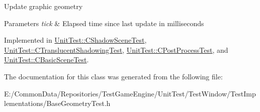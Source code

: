 Update graphic geometry 
\begin{DoxyParams}{Parameters}
{\em tick} & Elapsed time since last update in milliseconds \\
\hline
\end{DoxyParams}


Implemented in \mbox{\hyperlink{class_unit_test_1_1_c_shadow_scene_test_a5586404efaf70bc59cefd4616fe7f761}{Unit\+Test\+::\+C\+Shadow\+Scene\+Test}}, \mbox{\hyperlink{class_unit_test_1_1_c_translucent_shadowing_test_a6d0809018d48d6f3f9e80147b894da5d}{Unit\+Test\+::\+C\+Translucent\+Shadowing\+Test}}, \mbox{\hyperlink{class_unit_test_1_1_c_post_process_test_aa1da5079813a860b1cc8a3554bce6f04}{Unit\+Test\+::\+C\+Post\+Process\+Test}}, and \mbox{\hyperlink{class_unit_test_1_1_c_basic_scene_test_a670726a40875ee0981cca18a3ea7ad0b}{Unit\+Test\+::\+C\+Basic\+Scene\+Test}}.



The documentation for this class was generated from the following file\+:\begin{DoxyCompactItemize}
\item 
E\+:/\+Common\+Data/\+Repositories/\+Test\+Game\+Engine/\+Unit\+Test/\+Test\+Window/\+Test\+Implementations/Base\+Geometry\+Test.\+h\end{DoxyCompactItemize}
